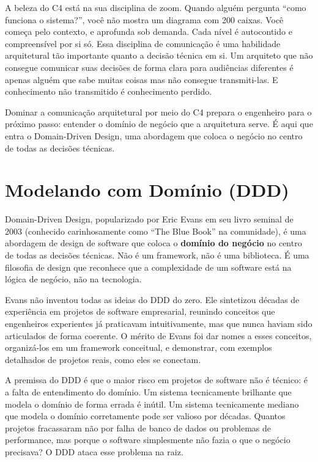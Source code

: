 A beleza do C4 está na sua disciplina de zoom. Quando alguém pergunta ``como
funciona o sistema?'', você não mostra um diagrama com 200 caixas. Você começa
pelo contexto, e aprofunda sob demanda. Cada nível é autocontido e compreensível
por si só. Essa disciplina de comunicação é uma habilidade arquitetural tão
importante quanto a decisão técnica em si. Um arquiteto que não consegue
comunicar suas decisões de forma clara para audiências diferentes é apenas
alguém que sabe muitas coisas mas não consegue transmiti-las. E conhecimento
não transmitido é conhecimento perdido.

Dominar a comunicação arquitetural por meio do C4 prepara o engenheiro para o
próximo passo: entender o domínio de negócio que a arquitetura
serve. É aqui que entra o Domain-Driven Design, uma abordagem que coloca o
negócio no centro de todas as decisões técnicas.


\section{Modelando com Domínio (DDD)}

Domain-Driven Design, popularizado por Eric Evans em seu livro seminal de 2003
(conhecido carinhosamente como ``The Blue Book'' na comunidade), é uma abordagem
de design de software que coloca o \textbf{domínio do negócio} no centro de todas
as decisões técnicas. Não é um framework, não é uma biblioteca. É uma filosofia
de design que reconhece que a complexidade de um software está na lógica de
negócio, não na tecnologia.

Evans não inventou todas as ideias do DDD do zero. Ele sintetizou décadas de
experiência em projetos de software empresarial, reunindo conceitos que
engenheiros experientes já praticavam intuitivamente, mas que nunca haviam
sido articulados de forma coerente. O mérito de Evans foi dar nomes a esses
conceitos, organizá-los em um framework conceitual, e demonstrar, com
exemplos detalhados de projetos reais, como eles se conectam.

A premissa do DDD é que o maior risco em projetos de software não
é técnico: é a falta de entendimento do domínio. Um sistema tecnicamente
brilhante que modela o domínio de forma errada é inútil. Um sistema
tecnicamente mediano que modela o domínio corretamente pode ser valioso por
décadas. Quantos projetos fracassaram não por falha de banco de dados ou
problemas de performance, mas porque o software simplesmente não fazia o que
o negócio precisava? O DDD ataca esse problema na raiz.

